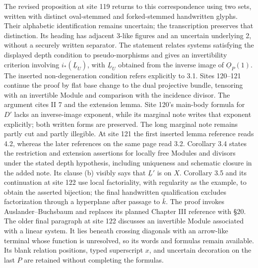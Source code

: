 \documentclass[10pt,a4paper]{article}
\begin{document}
The revised proposition at site 119 returns to this correspondence using two sets, written with distinct oval-stemmed and forked-stemmed handwritten glyphs. Their alphabetic identification remains uncertain; the transcription preserves that distinction. Its heading has adjacent 3-like figures and an uncertain underlying 2, without a securely written separator. The statement relates systems satisfying the displayed depth condition to pseudo-morphisms and gives an invertibility criterion involving $i_*(\underline L_U)$, with $\underline L_U$ obtained from the inverse image of $\underline O_P(1)$. The inserted non-degeneration condition refers explicitly to 3.1. Sites 120--121 continue the proof by flat base change to the dual projective bundle, tensoring with an invertible Module and comparison with the incidence divisor. The argument cites II 7 and the extension lemma. Site 120's main-body formula for $D'$ lacks an inverse-image exponent, while its marginal note writes that exponent explicitly; both written forms are preserved. The long marginal note remains partly cut and partly illegible. At site 121 the first inserted lemma reference reads 4.2, whereas the later references on the same page read 3.2. Corollary 3.4 states the restriction and extension assertions for locally free Modules and divisors under the stated depth hypothesis, including uniqueness and schematic closure in the added note. Its clause (b) visibly says that $\underline L'$ is on $X$. Corollary 3.5 and its continuation at site 122 use local factoriality, with regularity as the example, to obtain the asserted bijection; the final handwritten qualification excludes factorization through a hyperplane after passage to $\bar k$. The proof invokes Auslander--Buchsbaum and replaces its planned Chapter III reference with \S 20. The older final paragraph at site 122 discusses an invertible Module associated with a linear system. It lies beneath crossing diagonals with an arrow-like terminal whose function is unresolved, so its words and formulas remain available. Its blank relation positions, typed superscript $x$, and uncertain decoration on the last $P$ are retained without completing the formulas.
\par{}

\par{}
\end{document}
